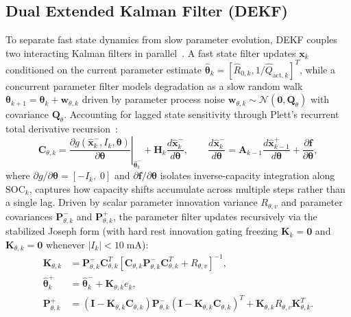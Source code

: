 \documentclass[11pt,a4paper]{article}
\begin{document}
\subsection{Dual Extended Kalman Filter (DEKF)}
To separate fast state dynamics from slow parameter evolution, DEKF couples two interacting Kalman filters in parallel~\cite{Plett2004part3,Charkhgard2010dekf}. A fast state filter updates $\mathbf{x}_k$ conditioned on the current parameter estimate $\hat{\boldsymbol{\theta}}_k = [\hat{R}_{0,k}, 1/\hat{Q}_{\text{act},k}]^T$, while a concurrent parameter filter models degradation as a slow random walk $\boldsymbol{\theta}_{k+1} = \boldsymbol{\theta}_k + \mathbf{w}_{\theta,k}$ driven by parameter process noise $\mathbf{w}_{\theta,k} \sim \mathcal{N}(\mathbf{0}, \mathbf{Q}_\theta)$ with covariance $\mathbf{Q}_\theta$. Accounting for lagged state sensitivity through Plett's recurrent total derivative recursion~\cite{Plett2004part3}:
\begin{equation}\label{eqn:dekf_param_jacobian}
\mathbf{C}_{\theta,k} = \left.\frac{\partial g(\hat{\mathbf{x}}_k^-, I_k, \boldsymbol{\theta})}{\partial \boldsymbol{\theta}}\right|_{\hat{\boldsymbol{\theta}}_k^-} + \mathbf{H}_k \frac{d\hat{\mathbf{x}}_k^-}{d\boldsymbol{\theta}}, \qquad
\frac{d\hat{\mathbf{x}}_k^-}{d\boldsymbol{\theta}} = \mathbf{A}_{k-1} \frac{d\hat{\mathbf{x}}_{k-1}^+}{d\boldsymbol{\theta}} + \frac{\partial \mathbf{f}}{\partial \boldsymbol{\theta}},
\end{equation}
where $\partial g/\partial\boldsymbol{\theta} = [-I_k,\; 0]$ and $\partial \mathbf{f}/\partial \boldsymbol{\theta}$ isolates inverse-capacity integration along $\text{SOC}_k$, captures how capacity shifts accumulate across multiple steps rather than a single lag. Driven by scalar parameter innovation variance $R_{\theta,v}$ and parameter covariances $\mathbf{P}_{\theta,k}^-$ and $\mathbf{P}_{\theta,k}^+$, the parameter filter updates recursively via the stabilized Joseph form (with hard rest innovation gating freezing $\mathbf{K}_k = \mathbf{0}$ and $\mathbf{K}_{\theta,k} = \mathbf{0}$ whenever $|I_k| < 10\;\mathrm{mA}$):
\begin{align}
\mathbf{K}_{\theta,k} &= \mathbf{P}_{\theta,k}^- \mathbf{C}_{\theta,k}^T [ \mathbf{C}_{\theta,k} \mathbf{P}_{\theta,k}^- \mathbf{C}_{\theta,k}^T + R_{\theta,v} ]^{-1}, \label{eqn:dekf_param_gain}\\
\hat{\boldsymbol{\theta}}_k^+ &= \hat{\boldsymbol{\theta}}_k^- + \mathbf{K}_{\theta,k} e_k, \label{eqn:dekf_param_upd}\\
\mathbf{P}_{\theta,k}^+ &= (\mathbf{I} - \mathbf{K}_{\theta,k} \mathbf{C}_{\theta,k}) \mathbf{P}_{\theta,k}^- (\mathbf{I} - \mathbf{K}_{\theta,k} \mathbf{C}_{\theta,k})^T + \mathbf{K}_{\theta,k} R_{\theta,v} \mathbf{K}_{\theta,k}^T. \label{eqn:dekf_param_cov}
\end{align}
\end{document}
